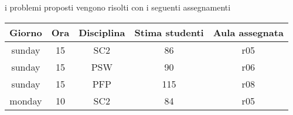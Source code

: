 \noindent
i problemi proposti vengono risolti con i seguenti assegnamenti

\begin{table}[h]
    \begin{small}
        \begin{center}
            \begin{tabular}[c]{c|c|c|c|c}
                Giorno & Ora & Disciplina & Stima studenti & Aula assegnata \\
                \hline
                sunday & 15 & SC2 & 86 & r05 \\
                sunday & 15 & PSW & 90 & r06 \\
                sunday & 15 & PFP & 115 & r08 \\
                monday & 10 & SC2 & 84 & r05
            \end{tabular}
        \end{center}
    \end{small}
\end{table}
